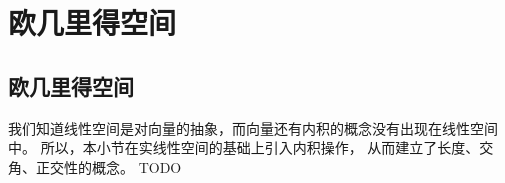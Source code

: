 \chapter{欧几里得空间}

\section{欧几里得空间}
我们知道线性空间是对向量的抽象，而向量还有内积的概念没有出现在线性空间中。
所以，本小节在实线性空间的基础上引入内积操作，
从而建立了长度、交角、正交性的概念。
TODO
